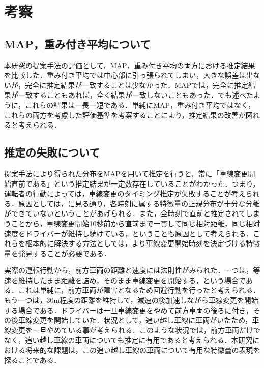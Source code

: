 \chapter{考察}
\section{MAP，重み付き平均について}
本研究の提案手法の評価として，MAP，重み付き平均の両方における推定結果を比較した．重み付き平均では中心部に引っ張られてしまい，大きな誤差は出ないが，完全に推定結果が一致することは少なかった．MAPでは，完全に推定結果が一致することもあれば，全く結果が一致しないこともあった．でも述べたように，これらの結果は一長一短である．単純にMAP，重み付き平均ではなく，これらの両方を考慮した評価基準を考案することにより，推定結果の改善が図れると考えられる．
\section{推定の失敗について}
提案手法により得られた分布をMAPを用いて推定を行うと，常に「車線変更開始直前である」という推定結果が一定数存在していることがわかった．つまり，運転者の行動によっては，車線変更のタイミング推定が失敗することが考えられる．原因としては，に見る通り，各時刻に属する特徴量の正規分布が十分な分離ができていないということがあげられる．また，全時刻で直前と推定されてしまうことから，車線変更開始10秒前から直前まで一貫して同じ相対距離，同じ相対速度をドライバーが維持し続けている，ということも原因として考えられる．これらを根本的に解決する方法としては，より車線変更開始時刻を決定づける特徴量を発見することが必要である．
\par
実際の運転行動から，前方車両の距離と速度には法則性がみられた．一つは，等速を維持したまま距離を詰め，そのまま車線変更を開始する，という場合である．これは単純に，前方車両が障害となるため回避行動を行ったと考えられる．もう一つは，30m程度の距離を維持して，減速の後加速しながら車線変更を開始する場合である．ドライバーは一旦車線変更をやめて前方車両の後ろに付き，その後車線変更を開始していた．状況として，追い越し車線に車両がいたため，車線変更を一旦やめている事が考えられる．このような状況では，前方車両だけでなく，追い越し車線の車両についても推定に有用であると考えられる．本研究における将来的な課題は，この追い越し車線の車両について有用な特徴量の表現を探ることである．



\par
